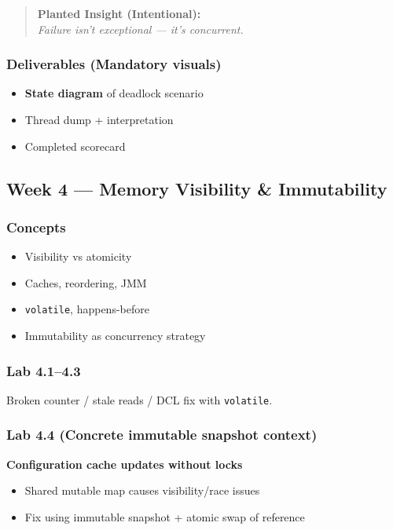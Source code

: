 \documentclass[11pt,a4paper]{article}
\begin{document}
	\begin{quote}
		\textbf{Planted Insight (Intentional):}\\
		\textit{Failure isn't exceptional --- it's concurrent.}
	\end{quote}
	
	\subsubsection*{Deliverables (Mandatory visuals)}
	\begin{itemize}[leftmargin=*]
		\item \textbf{State diagram} of deadlock scenario
		\item Thread dump + interpretation
		\item Completed scorecard
	\end{itemize}
	
	\subsection*{Week 4 --- Memory Visibility \& Immutability}
	
	\subsubsection*{Concepts}
	\begin{itemize}[leftmargin=*]
		\item Visibility vs atomicity
		\item Caches, reordering, JMM
		\item \texttt{volatile}, happens-before
		\item Immutability as concurrency strategy
	\end{itemize}
	
	\subsubsection*{Lab 4.1--4.3}
	Broken counter / stale reads / DCL fix with \texttt{volatile}.
	
	\subsubsection*{Lab 4.4 (Concrete immutable snapshot context)}
	\textbf{Configuration cache updates without locks}
	\begin{itemize}[leftmargin=*]
		\item Shared mutable map causes visibility/race issues
		\item Fix using immutable snapshot + atomic swap of reference
	\end{itemize}
	
\end{document}
